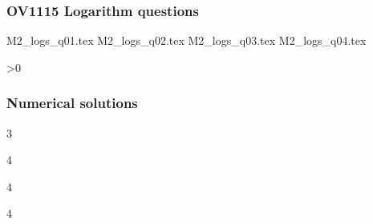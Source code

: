 \subsubsection{OV1115 Logarithm questions}
\begin{questions}


{M2_logs_q01.tex}
{M2_logs_q02.tex}
{M2_logs_q03.tex}
{M2_logs_q04.tex}

\ifnum\value{printSols}>0
	\subsubsection*{Numerical solutions}
	\setcounter{solNo}{2}
	\begin{enumerate}
	\end{enumerate}
	\else
\fi

\end{questions}